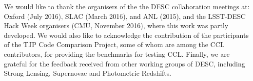 % 
We would like to thank the organisers of the the DESC collaboration meetings at:
Oxford (July 2016), SLAC (March 2016), and ANL (2015), 
and the LSST-DESC Hack Week organisers (CMU, November 2016), where this work 
was partly developed. We would also like to acknowledge the
contribution of the participants of the TJP Code Comparison Project, some of whom
are among the CCL contributors, for providing the benchmarks for 
testing CCL. Finally, we are grateful for the feedback received from
other working groups of DESC, including Strong Lensing, Supernovae
and Photometric Redshifts.
% 
